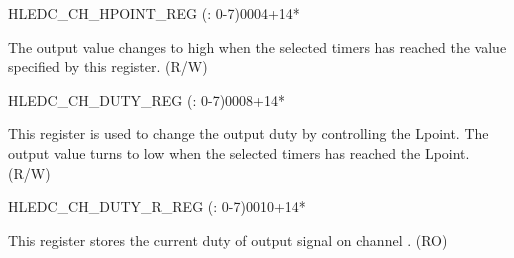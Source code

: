 \begin{register}{H}{LEDC\_CH\_HPOINT\_REG (: 0-7)}{\hexprefix{}0004+\hexprefix{}14*}\label{regdesc:LEDCCHNHPOINTREG}
%
%
\regnewline%
\begin{regdesc}\begin{reglist}
\label{fielddesc:LEDCHPOINTCHN}\item [LEDC\_HPOINT\_CH\regindex{n}] The output value changes to high when the selected timers has reached the value specified by this register. (R/W)
\end{reglist}\end{regdesc}
\end{register}


\begin{register}{H}{LEDC\_CH\_DUTY\_REG (: 0-7)}{\hexprefix{}0008+\hexprefix{}14*}\label{regdesc:LEDCCHNDUTYREG}
%
%
\regnewline%
\begin{regdesc}\begin{reglist}
\label{fielddesc:LEDCDUTYCHN}\item [LEDC\_DUTY\_CH\regindex{n}] This register is used to change the output duty by controlling the Lpoint. The output value turns to low when the selected timers has reached the Lpoint. (R/W)
\end{reglist}\end{regdesc}
\end{register}


\begin{register}{H}{LEDC\_CH\_DUTY\_R\_REG (: 0-7)}{\hexprefix{}0010+\hexprefix{}14*}\label{regdesc:LEDCCHNDUTYRREG}
%
%
\regnewline%
\begin{regdesc}\begin{reglist}
\label{fielddesc:LEDCDUTYRCHN}\item [LEDC\_DUTY\_R\_CH\regindex{n}] This register stores the current duty of output signal on channel . (RO)
\end{reglist}\end{regdesc}
\end{register}


